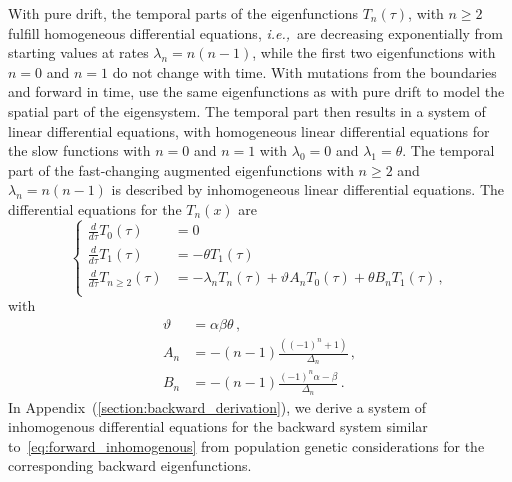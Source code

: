 \documentclass[preprint]{elsarticle}
\newcommand\ie{{\it i.e.,}}
\begin{document}
With pure drift, the temporal parts of the eigenfunctions $T_n(\tau)$, with $n\geq 2$ fulfill homogeneous differential equations, \ie\ are decreasing exponentially from starting values at rates $\lambda_n=n(n-1)$, while the first two eigenfunctions with $n=0$ and $n=1$ do not change with time. With mutations from the boundaries and forward in time, \citet{Vogl16} use the same eigenfunctions as with pure drift to model the spatial part of the eigensystem. The temporal part then results in a system of linear differential equations, with homogeneous linear differential equations for the slow functions with $n=0$ and $n=1$ with $\lambda_0=0$ and $\lambda_1=\theta$. The temporal part of the fast-changing augmented eigenfunctions with $n\geq 2$ and $\lambda_n=n(n-1)$ is described by inhomogeneous linear differential equations. The differential equations for the $T_n(x)$ are
\begin{equation}\label{eq:forward_inhomogenous}
\begin{cases}
  \frac{d}{d\tau} T_0(\tau)&= 0\\
  \frac{d}{d\tau} T_1(\tau)&= -\theta T_1(\tau)\\
  \frac{d}{d\tau} T_{n\geq2}(\tau)&= -\lambda_n T_n(\tau)+\vartheta A_n T_0(\tau)+\theta B_n T_1(\tau)\,,\\
\end{cases}
\end{equation}
with
\begin{equation}
\begin{split}
    \vartheta&=\alpha\beta\theta\,,\\
    A_n&=-(n-1)\frac{((-1)^n+1)}{\Delta_n}\,,\\
    B_n&=-(n-1)\frac{(-1)^n\alpha-\beta}{\Delta_n}\,.
\end{split}
\end{equation}
In Appendix~(\ref{section:backward_derivation}), we derive a system of inhomogenous differential equations for the backward system similar to~\eqref{eq:forward_inhomogenous} from population genetic considerations for the corresponding backward eigenfunctions. 
\end{document}
